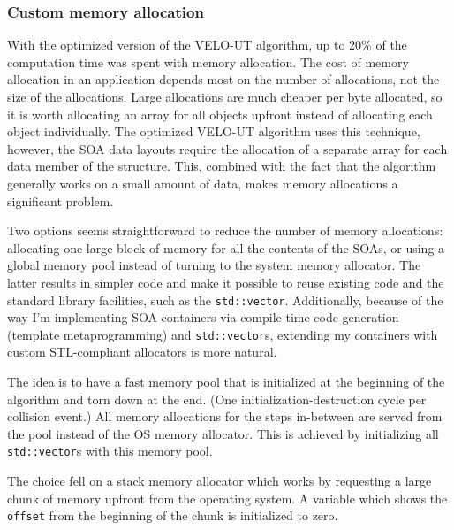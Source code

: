 \documentclass[12pt]{article}
\newcommand{\code}[1]{\texttt{#1}}
\begin{document}
\subsubsection{Custom memory allocation} \label{sec_velout_stack_alloc}

With the optimized version of the VELO-UT algorithm, up to 20\% of the computation time was spent with memory allocation. The cost of memory allocation in an application depends most on the number of allocations, not the size of the allocations. Large allocations are much cheaper per byte allocated, so it is worth allocating an array for all objects upfront instead of allocating each object individually. The optimized VELO-UT algorithm uses this technique, however, the SOA data layouts require the allocation of a separate array for each data member of the structure. This, combined with the fact that the algorithm generally works on a small amount of data, makes memory allocations a significant problem.

\vspace{1pc}

Two options seems straightforward to reduce the number of memory allocations: allocating one large block of memory for all the contents of the SOAs, or using a global memory pool instead of turning to the system memory allocator. The latter results in simpler code and make it possible to reuse existing code and the standard library facilities, such as the \code{std::vector}. Additionally, because of the way I'm implementing SOA containers via compile-time code generation (template metaprogramming) and \code{std::vector}s, extending my containers with custom STL-compliant allocators is more natural.

\vspace{1pc}

The idea is to have a fast memory pool that is initialized at the beginning of the algorithm and torn down at the end. (One initialization-destruction cycle per collision event.) All memory allocations for the steps in-between are served from the pool instead of the OS memory allocator. This is achieved by initializing all \code{std::vector}s with this memory pool.


\vspace{1pc}

The choice fell on a stack memory allocator which works by requesting a large chunk of memory upfront from the operating system. A variable which shows the \code{offset} from the beginning of the chunk is initialized to zero.
\end{document}
